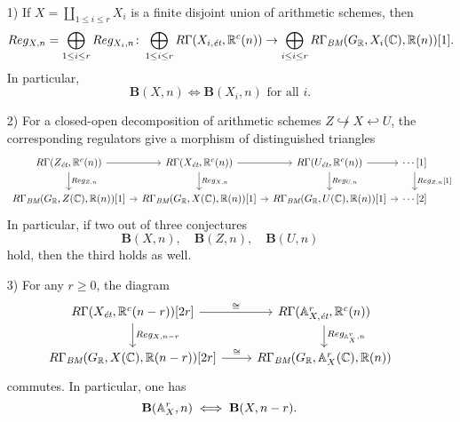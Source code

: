 \documentclass{article}
\numberwithin{equation}{section}
\begin{document}
\begin{lemma}
  \label{lemma:compatibility-of-B(X,n)}
  ~

  \begin{enumerate}
  \item[1)] If $X = \coprod_{1 \le i \le r} X_i$ is a finite disjoint union of
    arithmetic schemes, then
    \[ Reg_{X,n} = \bigoplus_{1 \le i \le r} Reg_{X_i,n}\colon
      \bigoplus_{1 \le i \le r} R\Gamma (X_{i,\et}, \RR^c (n)) \to
      \bigoplus_{i \le i \le r} R\Gamma_\BM (G_\RR, X_i (\CC), \RR (n)) [1]. \]
    In particular,
    $$\mathbf{B} (X,n) \iff \mathbf{B} (X_i,n)\text{ for all }i.$$

  \item[2)] For a closed-open decomposition of arithmetic schemes
    $Z \not\hookrightarrow X \hookleftarrow U$, the corresponding regulators
    give a morphism of distinguished triangles
    \[ \begin{tikzcd}[column sep=0.75em]
        R\Gamma (Z_\et, \RR^c (n)) \ar{r}\ar{d}{Reg_{Z,n}} & R\Gamma (X_\et, \RR^c (n)) \ar{r}\ar{d}{Reg_{X,n}} & R\Gamma (U_\et, \RR^c (n)) \ar{r}\ar{d}{Reg_{U,n}} & \cdots [1]\ar{d}{Reg_{Z,n} [1]} \\
        R\Gamma_\BM (G_\RR, Z (\CC), \RR (n)) [1] \ar{r} & R\Gamma_\BM (G_\RR, X (\CC), \RR (n)) [1] \ar{r} & R\Gamma_\BM (G_\RR, U (\CC), \RR (n)) [1] \ar{r} & \cdots [2]
      \end{tikzcd} \]
    In particular, if two out of three conjectures
    \[ \mathbf{B} (X,n), \quad
      \mathbf{B} (Z,n), \quad
      \mathbf{B} (U,n) \]
    hold, then the third holds as well.

  \item[3)] For any $r \ge 0$, the diagram
    \[ \begin{tikzcd}
        R\Gamma (X_\et, \RR^c (n-r)) [2r] \ar{d}{Reg_{X,n-r}}\ar{r}{\cong} & R\Gamma (\AA^r_{X,\et}, \RR^c (n))\ar{d}{Reg_{\AA^r_X,n}} \\
        R\Gamma_\BM (G_\RR, X (\CC), \RR (n-r)) [2r] \ar{r}{\cong} & R\Gamma_\BM (G_\RR, \AA^r_X (\CC), \RR (n))
      \end{tikzcd} \]
    commutes. In particular, one has
    $$\mathbf{B} (\AA^r_X, n) \iff \mathbf{B} (X, n-r).$$
  \end{enumerate}


\end{lemma}
\end{document}
